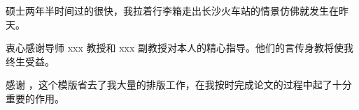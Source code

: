 

\begin{ack}
  硕士两年半时间过的很快，我拉着行李箱走出长沙火车站的情景仿佛就发生在昨天。

  衷心感谢导师 xxx 教授和 xxx 副教授对本人的精心指导。他们的言传身教将使我终生受益。

  感谢 \nudtpaper{}，这个模版省去了我大量的排版工作，在我按时完成论文的过程中起了十分重要的作用。

\end{ack}

